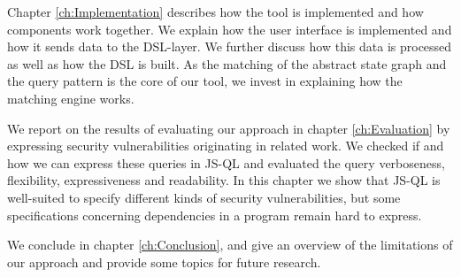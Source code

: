 Chapter \ref{ch:Implementation} describes how the tool is implemented and how components work together. We explain how the user interface is implemented and how it sends data to the DSL-layer. We further discuss how this data is processed as well as how the DSL is built. As the matching of the abstract state graph and the query pattern is the core of our tool, we invest in explaining how the matching engine works.

We report on the results of evaluating our approach in chapter \ref{ch:Evaluation} by expressing security vulnerabilities originating in related work. We checked if and how we can express these queries in JS-QL and evaluated the query verboseness, flexibility, expressiveness and readability. In this chapter we show that JS-QL is well-suited to specify different kinds of security vulnerabilities, but some specifications concerning dependencies in a program remain hard to express. 

We conclude in chapter \ref{ch:Conclusion}, and give an overview of the limitations of our approach and provide some topics for future research.
